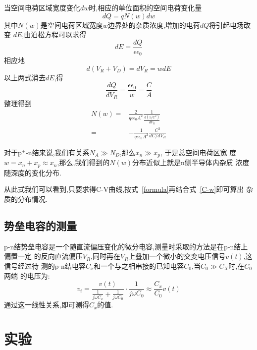 \documentclass[aps,pre,12pt,preprint,onecolumn,showpacs,showkeys]{revtex4-1}
\begin{document}
当空间电荷区域宽度变化$dw$时,相应的单位面积的空间电荷变化量
\begin{equation}
    dQ = qN(w)dw
\end{equation}
其中$N(w)$是空间电荷区域宽度$w$边界处的杂质浓度,增加的电荷$dQ$将引起电场改变
$dE$,由泊松方程可以求得
\begin{equation}
    dE = \frac{dQ}{\epsilon\epsilon_0}
\end{equation}
相应地
\begin{equation}
    d(V_R + V_D) = dV_R = wdE
\end{equation}
以上两式消去$dE$,得
\begin{equation}
    \label{C-w}
    \frac{dQ}{dV_R} = \frac{\epsilon\epsilon_0}{w} = \frac{C}{A}
\end{equation}
整理得到
\begin{equation}
    \label{formula}
    \begin{split}
    N(w) = & \frac{2}{q\epsilon\epsilon_0A^2}\frac{1}{\frac{d(1/C^2)}{dV_R}} \\
    = & -\frac{1}{q\epsilon\epsilon_0A^2}\frac{C^3}{dC/dV_R}
    \end{split}
\end{equation}

对于p$^+$-n结来说,我们有关系$N_A \gg N_D$,那么$x_n \gg x_p$, 于是总空间电荷区宽
度$w = x_n + x_p \approx x_n$,那么,我们得到的$N(w)$分布近似上就是n侧半导体内杂质
浓度随深度的变化分布.

从此式我们可以看到,只要求得C-V曲线,按式~\ref{formula}再结合式~\ref{C-w}即可算出
杂质的分布情况.

\subsection{势垒电容的测量}

p-n结势垒电容是一个随直流偏压变化的微分电容,测量时采取的方法是在p-n结上偏置一定
的反向直流偏压$V_R$,同时再在$V_R$上叠加一个微小的交变电压信号$v(t)$,这信号经过待
测的p-n结电容$C_x$和一个与之相串接的已知电容$C_0$,当$C_0 \gg C_X$时,在$C_0$两端
的电压为:
\begin{equation}
   v_i = \frac{v(t)}{\frac{1}{j\omega C_x} + \frac{1}{j\omega
           C_0}}\cdot\frac{1}{j\omega C_0} \approx \frac{C_x}{C_0} v(t)
\end{equation}
通过这一线性关系,即可测得$C_x$的值.

\section{实验}
\end{document}
